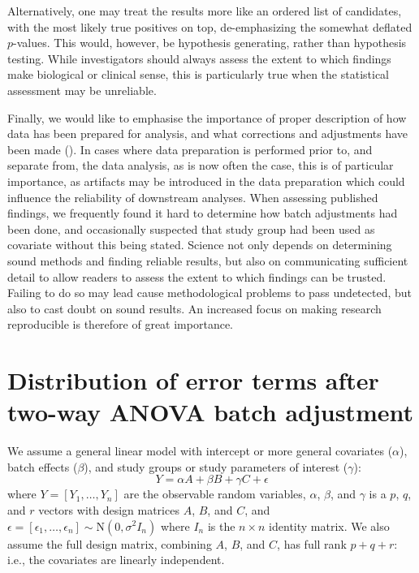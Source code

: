 \documentclass{bio}
\begin{document}
Alternatively, one may treat the results more like an ordered list of candidates, with the most likely true positives on top, de-emphasizing the somewhat deflated $p$-values. This would, however, be hypothesis generating, rather than hypothesis testing. While investigators should always assess the extent to which findings make biological or clinical sense, this is particularly true when the statistical assessment may be unreliable.

Finally, we would like to emphasise the importance of proper description of how data has been prepared for analysis, and what corrections and adjustments have been made (\citealp{Sandve2013}). In cases where data preparation is performed prior to, and separate from, the data analysis, as is now often the case, this is of particular importance, as artifacts may be introduced in the data preparation which could influence the reliability of downstream analyses. When assessing published findings, we frequently found it hard to determine how batch adjustments had been done, and occasionally suspected that study group had been used as covariate without this being stated. Science not only depends on determining sound methods and finding reliable results, but also on communicating sufficient detail to allow readers to assess the extent to which findings can be trusted. Failing to do so may lead cause methodological problems to pass undetected, but also to cast doubt on sound results. An increased focus on making research reproducible is therefore of great importance.



\appendix
\section{Distribution of error terms after two-way ANOVA batch adjustment}
\label{sec:chiApprox}

We assume a general linear model with intercept or more general covariates ($\alpha$), batch effects ($\beta$), and study groups or study parameters of interest ($\gamma$):
\begin{equation}
Y=\alpha A+\beta B+\gamma C+\epsilon
\end{equation}
where $Y=[Y_1,\ldots,Y_n]$ are the observable random variables, $\alpha$, $\beta$, and $\gamma$ is a $p$, $q$, and $r$ vectors with design matrices $A$, $B$, and $C$, and $\epsilon=[\epsilon_1,\ldots,\epsilon_n]\sim\text{N}(0,\sigma^2I_n)$ where $I_n$ is the $n\times n$ identity matrix. We also assume the full design matrix, combining $A$, $B$, and $C$, has full rank $p+q+r$: i.e., the covariates are linearly independent.
\end{document}
